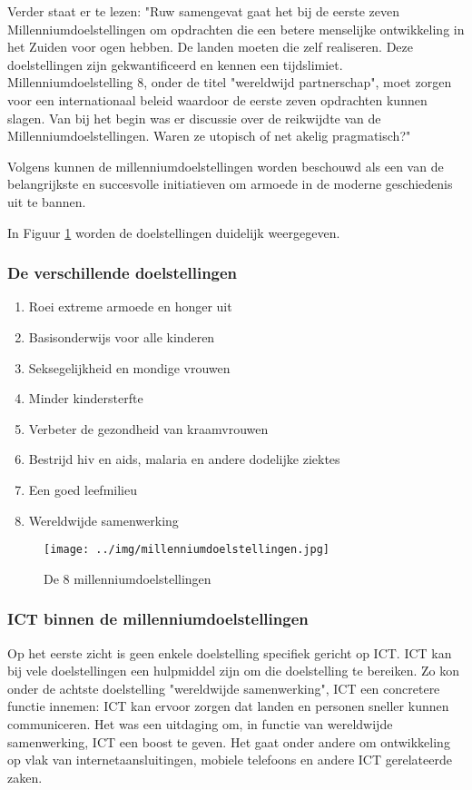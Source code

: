 Verder staat er te lezen: "Ruw samengevat gaat het bij de eerste zeven Millenniumdoelstellingen om opdrachten die een betere menselijke ontwikkeling in het Zuiden voor ogen hebben. De landen moeten die zelf realiseren. Deze doelstellingen zijn gekwantificeerd en kennen een tijdslimiet. Millenniumdoelstelling 8, onder de titel "wereldwijd partnerschap", moet zorgen voor een internationaal beleid waardoor de eerste zeven opdrachten kunnen slagen. Van bij het begin was er discussie over de reikwijdte van de Millenniumdoelstellingen. Waren ze utopisch of net akelig pragmatisch?" \autocite{11.11.112019}

Volgens \autocite{Tjoa2016} kunnen de millenniumdoelstellingen worden beschouwd als een van de belangrijkste en succesvolle initiatieven om armoede in de moderne geschiedenis uit te bannen.

In Figuur \ref{milleniumdoelstellingen} worden de doelstellingen duidelijk weergegeven.

 
 \subsubsection{De verschillende doelstellingen}
 \begin{enumerate}
 \item Roei extreme armoede en honger uit
 \item Basisonderwijs voor alle kinderen
 \item Seksegelijkheid en mondige vrouwen
 \item Minder kindersterfte
 \item Verbeter de gezondheid van kraamvrouwen
 \item Bestrijd hiv en aids, malaria en andere dodelijke ziektes
 \item Een goed leefmilieu 
 \item Wereldwijde samenwerking
\end{enumerate}
\autocite{NOS2015}

\begin{figure}[h!]
	\texttt{[image: ../img/millenniumdoelstellingen.jpg]}
	\caption{De 8 millenniumdoelstellingen \autocite{NOS2015}}
	\label{milleniumdoelstellingen}
\end{figure}

 \subsubsection{ICT binnen de millenniumdoelstellingen}
 Op het eerste zicht is geen enkele doelstelling specifiek gericht op ICT. ICT kan bij vele doelstellingen een hulpmiddel zijn om die doelstelling te bereiken. Zo kon onder de achtste doelstelling "wereldwijde samenwerking", ICT een concretere functie innemen: ICT kan ervoor zorgen dat landen en personen sneller kunnen communiceren. Het was een uitdaging om, in functie van wereldwijde samenwerking, ICT een boost te geven. Het gaat onder andere om ontwikkeling op vlak van internetaansluitingen, mobiele telefoons en andere ICT gerelateerde zaken. \autocite{NOS2015}
 
